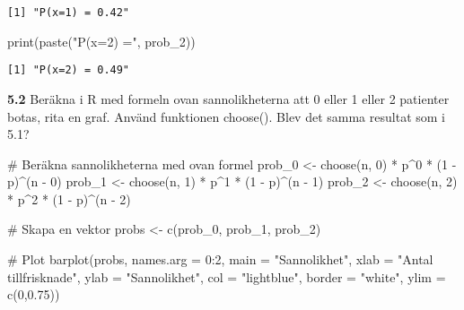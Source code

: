 \documentclass[
  letterpaper,
  DIV=11,
  numbers=noendperiod]{scrartcl}
\newenvironment{Shaded}{\begin{snugshade}}{\end{snugshade}}
\newcommand{\AttributeTok}[1]{\textcolor[rgb]{0.40,0.45,0.13}{#1}}
\newcommand{\CommentTok}[1]{\textcolor[rgb]{0.37,0.37,0.37}{#1}}
\newcommand{\DecValTok}[1]{\textcolor[rgb]{0.68,0.00,0.00}{#1}}
\newcommand{\FloatTok}[1]{\textcolor[rgb]{0.68,0.00,0.00}{#1}}
\newcommand{\FunctionTok}[1]{\textcolor[rgb]{0.28,0.35,0.67}{#1}}
\newcommand{\NormalTok}[1]{\textcolor[rgb]{0.00,0.23,0.31}{#1}}
\newcommand{\OtherTok}[1]{\textcolor[rgb]{0.00,0.23,0.31}{#1}}
\newcommand{\SpecialCharTok}[1]{\textcolor[rgb]{0.37,0.37,0.37}{#1}}
\newcommand{\StringTok}[1]{\textcolor[rgb]{0.13,0.47,0.30}{#1}}
\begin{document}
\begin{verbatim}
[1] "P(x=1) = 0.42"
\end{verbatim}

\begin{Shaded}
\begin{Highlighting}[]
\FunctionTok{print}\NormalTok{(}\FunctionTok{paste}\NormalTok{(}\StringTok{"P(x=2) ="}\NormalTok{, prob\_2))}
\end{Highlighting}
\end{Shaded}

\begin{verbatim}
[1] "P(x=2) = 0.49"
\end{verbatim}

\textbf{5.2} Beräkna i R med formeln ovan sannolikheterna att 0 eller 1
eller 2 patienter botas, rita en graf. Använd funktionen choose(). Blev
det samma resultat som i 5.1?

\begin{Shaded}
\begin{Highlighting}[]
\CommentTok{\# Beräkna sannolikheterna med ovan formel}
\NormalTok{prob\_0 }\OtherTok{\textless{}{-}} \FunctionTok{choose}\NormalTok{(n, }\DecValTok{0}\NormalTok{) }\SpecialCharTok{*}\NormalTok{ p}\SpecialCharTok{\^{}}\DecValTok{0} \SpecialCharTok{*}\NormalTok{ (}\DecValTok{1} \SpecialCharTok{{-}}\NormalTok{ p)}\SpecialCharTok{\^{}}\NormalTok{(n }\SpecialCharTok{{-}} \DecValTok{0}\NormalTok{)}
\NormalTok{prob\_1 }\OtherTok{\textless{}{-}} \FunctionTok{choose}\NormalTok{(n, }\DecValTok{1}\NormalTok{) }\SpecialCharTok{*}\NormalTok{ p}\SpecialCharTok{\^{}}\DecValTok{1} \SpecialCharTok{*}\NormalTok{ (}\DecValTok{1} \SpecialCharTok{{-}}\NormalTok{ p)}\SpecialCharTok{\^{}}\NormalTok{(n }\SpecialCharTok{{-}} \DecValTok{1}\NormalTok{)}
\NormalTok{prob\_2 }\OtherTok{\textless{}{-}} \FunctionTok{choose}\NormalTok{(n, }\DecValTok{2}\NormalTok{) }\SpecialCharTok{*}\NormalTok{ p}\SpecialCharTok{\^{}}\DecValTok{2} \SpecialCharTok{*}\NormalTok{ (}\DecValTok{1} \SpecialCharTok{{-}}\NormalTok{ p)}\SpecialCharTok{\^{}}\NormalTok{(n }\SpecialCharTok{{-}} \DecValTok{2}\NormalTok{)}

\CommentTok{\# Skapa en vektor}
\NormalTok{probs }\OtherTok{\textless{}{-}} \FunctionTok{c}\NormalTok{(prob\_0, prob\_1, prob\_2)}

\CommentTok{\# Plot}
\FunctionTok{barplot}\NormalTok{(probs, }\AttributeTok{names.arg =} \DecValTok{0}\SpecialCharTok{:}\DecValTok{2}\NormalTok{, }\AttributeTok{main =} \StringTok{"Sannolikhet"}\NormalTok{, }\AttributeTok{xlab =} \StringTok{"Antal tillfrisknade"}\NormalTok{, }\AttributeTok{ylab =} \StringTok{"Sannolikhet"}\NormalTok{, }\AttributeTok{col =} \StringTok{"lightblue"}\NormalTok{, }\AttributeTok{border =} \StringTok{"white"}\NormalTok{, }\AttributeTok{ylim =} \FunctionTok{c}\NormalTok{(}\DecValTok{0}\NormalTok{,}\FloatTok{0.75}\NormalTok{))}
\end{Highlighting}
\end{Shaded}
\end{document}
